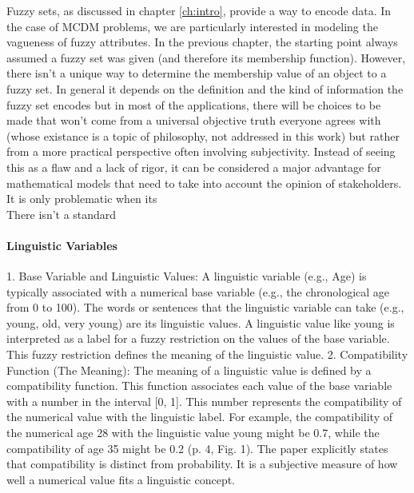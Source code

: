 
Fuzzy sets, as discussed in chapter \ref{ch:intro}, provide a way to encode data. In the case of MCDM  problems, we are particularly interested in modeling the vagueness of fuzzy attributes. In the previous chapter, the starting point always assumed a fuzzy set was given (and therefore its membership function). However, there isn't a unique way to determine the membership value of an object to a fuzzy set. In general it depends on the definition and the kind of information the fuzzy set encodes but in most of the applications, there will be choices to be made that won't come from a universal objective truth everyone agrees with (whose existance is a topic of philosophy, not addressed in this work) but rather from a more practical perspective often involving subjectivity. Instead of seeing this as a flaw and a lack of rigor, it can be considered a major advantage for mathematical models that need to take into account the opinion of stakeholders. It is only problematic when its  \\

There isn't a standard 

\paragraph{}

\paragraph{Linguistic Variables}
1. Base Variable and Linguistic Values:
A linguistic variable (e.g., Age) is typically associated with a numerical base variable (e.g., the chronological age from 0 to 100).
The words or sentences that the linguistic variable can take (e.g., young, old, very young) are its linguistic values.
A linguistic value like young is interpreted as a label for a fuzzy restriction on the values of the base variable. This fuzzy restriction defines the meaning of the linguistic value.
2. Compatibility Function (The Meaning):
The meaning of a linguistic value is defined by a compatibility function. This function associates each value of the base variable with a number in the interval [0, 1].
This number represents the compatibility of the numerical value with the linguistic label. For example, the compatibility of the numerical age 28 with the linguistic value young might be 0.7, while the compatibility of age 35 might be 0.2 (p. 4, Fig. 1).
The paper explicitly states that compatibility is distinct from probability. It is a subjective measure of how well a numerical value fits a linguistic concept.